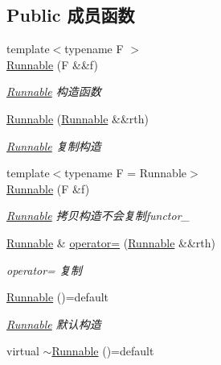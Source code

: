 \subsection*{Public 成员函数}
\begin{DoxyCompactItemize}
\item 
{\footnotesize template$<$typename F $>$ }\\\hyperlink{classRunnable_ab052afa8b53dd1e7c28e978962839446}{Runnable} (F \&\&f)
\begin{DoxyCompactList}\small\item\em \hyperlink{classRunnable}{Runnable} 构造函数 \end{DoxyCompactList}\item 
\hyperlink{classRunnable_ab2054720a62d059c59d0e8085d3be78e}{Runnable} (\hyperlink{classRunnable}{Runnable} \&\&rth)
\begin{DoxyCompactList}\small\item\em \hyperlink{classRunnable}{Runnable} 复制构造 \end{DoxyCompactList}\item 
{\footnotesize template$<$typename F  = Runnable$>$ }\\\hyperlink{classRunnable_aaac34b8a861ab506499f8ec791e7cc16}{Runnable} (F \&f)
\begin{DoxyCompactList}\small\item\em \hyperlink{classRunnable}{Runnable} 拷贝构造不会复制functor\+\_\+ \end{DoxyCompactList}\item 
\hyperlink{classRunnable}{Runnable} \& \hyperlink{classRunnable_ab41eea27867a9f54e94255851412bc77}{operator=} (\hyperlink{classRunnable}{Runnable} \&\&rth)
\begin{DoxyCompactList}\small\item\em operator= 复制 \end{DoxyCompactList}\item 
\mbox{\label{classRunnable_a5769222dcc4b2adca7723bfbdfa00cbb}} 
\hyperlink{classRunnable_a5769222dcc4b2adca7723bfbdfa00cbb}{Runnable} ()=default
\begin{DoxyCompactList}\small\item\em \hyperlink{classRunnable}{Runnable} 默认构造 \end{DoxyCompactList}\item 
\mbox{\label{classRunnable_a08557328273d2dfd3425507b1f972fcb}} 
virtual \hyperlink{classRunnable_a08557328273d2dfd3425507b1f972fcb}{$\sim$\+Runnable} ()=default

\end{DoxyCompactItemize}
